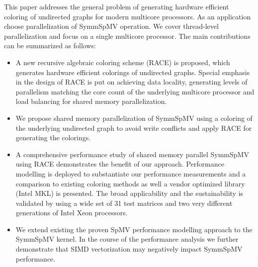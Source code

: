 This paper addresses the general problem of generating hardware efficient \DK coloring of undirected graphs for modern multicore processors. As an application choose parallelization of \acrshort{SymmSpMV} operation. We cover thread-level parallelization and focus on a single multicore processor. The main contributions can be summarized as follows: 
\begin{itemize}
\item A new recursive algebraic coloring scheme (RACE) is proposed, which generates hardware efficient \DK colorings of undirected graphs. Special emphasis in the design of RACE is put on achieving data locality, generating levels of parallelism matching the core count of the underlying multicore processor and load balancing for shared memory parallelization.
\item We propose shared memory parallelization of \acrshort{SymmSpMV}  using a \DTWO coloring of the underlying undirected graph to avoid write conflicts and apply RACE for generating the colorings.
\item A comprehensive performance study of shared memory parallel \acrshort{SymmSpMV} using RACE demonstrates the benefit of our approach. Performance modelling is deployed to substantiate our performance measurements and a comparison to existing coloring methods as well a vendor optimized library (Intel MKL) is presented. The broad applicability and the sustainability is validated by using a wide set of 31 test matrices and two very different generations of Intel Xeon processors.
\item We extend existing the proven \acrshort{SpMV} performance modelling approach to the \acrshort{SymmSpMV} kernel. In the course of the performance analysis we further demonstrate that SIMD vectorization may negatively impact \acrshort{SymmSpMV}  performance. 

\end{itemize}
